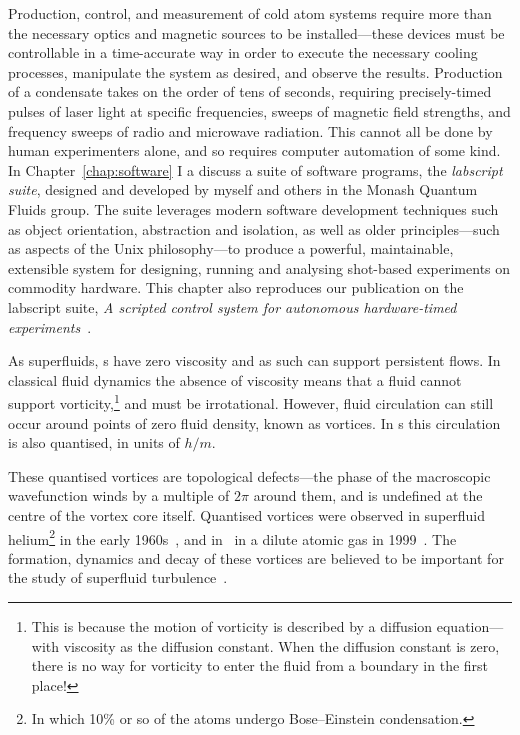 Production, control, and measurement of cold atom systems require more than the necessary optics and magnetic sources to be installed---these devices must be controllable in a time-accurate way in order to execute the necessary cooling processes, manipulate the system as desired, and observe the results. Production of a condensate takes on the order of tens of seconds, requiring precisely-timed pulses of laser light at specific frequencies, sweeps of magnetic field strengths, and frequency sweeps of radio and microwave radiation. This cannot all be done by human experimenters alone, and so requires computer automation of some kind. In Chapter~\ref{chap:software} I a discuss a suite of software programs, the \emph{labscript suite}, designed and developed by myself and others in the Monash Quantum Fluids group. The suite leverages modern software development techniques such as object orientation, abstraction and isolation, as well as older principles---such as aspects of the Unix philosophy---to produce a powerful, maintainable, extensible system for designing, running and analysing shot-based experiments on commodity hardware. This chapter also reproduces our publication on the labscript suite, \emph{A scripted control system for autonomous hardware-timed experiments}~\cite{starkey_scripted_2013}.

As superfluids, \bec s have zero viscosity and as such can support persistent flows. In classical fluid dynamics the absence of viscosity means that a fluid cannot support vorticity,\footnote{This is because the motion of vorticity is described by a diffusion equation---with viscosity as the diffusion constant. When the diffusion constant is zero, there is no way for vorticity to enter the fluid from a boundary in the first place!} and must be irrotational. However, fluid circulation can still occur around points of zero fluid density, known as vortices. In \bec s this circulation is also quantised, in units of $h/m$.

These quantised vortices are topological defects---the phase of the macroscopic wavefunction winds by a multiple of $2\pi$ around them, and is undefined at the centre of the vortex core itself.  Quantised vortices were observed in superfluid helium\footnote{In which 10\% or so of the atoms undergo Bose--Einstein condensation.} in the early 1960s~\cite{vinen_detection_1961}, and in \bec\ in a dilute atomic gas in 1999~\cite{matthews_vortices_1999}. The formation, dynamics and decay of these vortices are believed to be important for the study of superfluid turbulence~\cite{barenghi_quantized_2001}.


